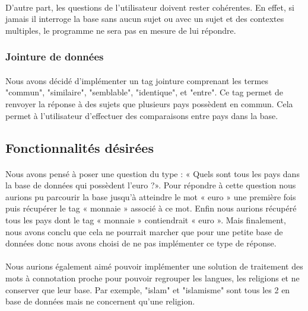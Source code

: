 \documentclass[11pt,a4paper]{article}
\begin{document}
\paragraph{}D'autre part, les questions de l'utilisateur doivent rester cohérentes. En effet, si jamais il interroge la base sans aucun sujet ou avec un sujet et des contextes multiples, le programme ne sera pas en mesure de lui répondre.

\subsubsection{Jointure de données}
\paragraph{}Nous avons décidé d'implémenter un tag jointure comprenant les termes "commun", "similaire", "semblable", "identique", et "entre". Ce tag permet de renvoyer la réponse à des sujets que plusieurs pays possèdent en commun. Cela permet à l'utilisateur d'effectuer des comparaisons entre pays dans la base.

\subsection{Fonctionnalités désirées}

\paragraph{}Nous avons pensé à poser une question du type : «  Quels sont tous les pays dans la base de données qui possèdent l’euro ?». Pour répondre à cette question nous aurions pu parcourir la base jusqu'à atteindre le mot « euro » une première fois puis  récupérer le tag « monnaie » associé à ce mot. Enfin nous aurions récupéré tous les pays dont le tag « monnaie » contiendrait « euro ». Mais finalement, nous avons conclu que cela ne pourrait marcher que pour une petite base de données donc nous avons choisi de ne pas implémenter ce type de réponse. 
\paragraph{}Nous aurions également aimé pouvoir implémenter une solution de traitement des mots à connotation proche pour pouvoir regrouper les langues, les religions et ne conserver que leur base. Par exemple, "islam" et "islamisme" sont tous les 2 en base de données mais ne concernent qu'une religion.
\end{document}
